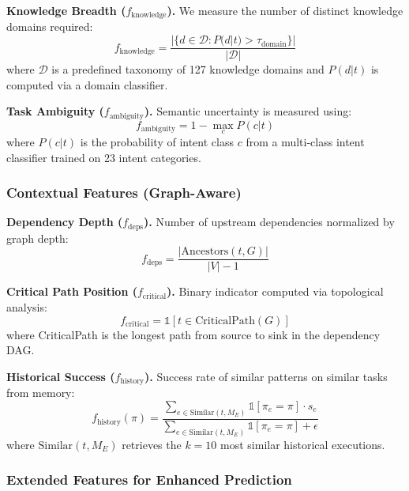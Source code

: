 \documentclass{article}
\theoremstyle{plain}
\theoremstyle{definition}
\theoremstyle{remark}
\begin{document}
\textbf{Knowledge Breadth ($f_{\text{knowledge}}$).} We measure the number of distinct knowledge domains required:
\begin{equation}
	f_{\text{knowledge}} = \frac{|\{d \in \mathcal{D} : P(d | t) > \tau_{\text{domain}}\}|}{|\mathcal{D}|}
\end{equation}
where $\mathcal{D}$ is a predefined taxonomy of 127 knowledge domains and $P(d|t)$ is computed via a domain classifier.

\textbf{Task Ambiguity ($f_{\text{ambiguity}}$).} Semantic uncertainty is measured using:
\begin{equation}
	f_{\text{ambiguity}} = 1 - \max_c P(c | t)
\end{equation}
where $P(c|t)$ is the probability of intent class $c$ from a multi-class intent classifier trained on 23 intent categories.

\subsubsection{Contextual Features (Graph-Aware)}

\textbf{Dependency Depth ($f_{\text{deps}}$).} Number of upstream dependencies normalized by graph depth:
\begin{equation}
	f_{\text{deps}} = \frac{|\text{Ancestors}(t, G)|}{|V| - 1}
\end{equation}

\textbf{Critical Path Position ($f_{\text{critical}}$).} Binary indicator computed via topological analysis:
\begin{equation}
	f_{\text{critical}} = \mathbb{1}[t \in \text{CriticalPath}(G)]
\end{equation}
where CriticalPath is the longest path from source to sink in the dependency DAG.

\textbf{Historical Success ($f_{\text{history}}$).} Success rate of similar patterns on similar tasks from memory:
\begin{equation}
	f_{\text{history}}(\pi) = \frac{\sum_{e \in \text{Similar}(t, M_E)} \mathbb{1}[\pi_e = \pi] \cdot s_e}{\sum_{e \in \text{Similar}(t, M_E)} \mathbb{1}[\pi_e = \pi] + \epsilon}
\end{equation}
where $\text{Similar}(t, M_E)$ retrieves the $k=10$ most similar historical executions.

\subsubsection{Extended Features for Enhanced Prediction}
\end{document}
